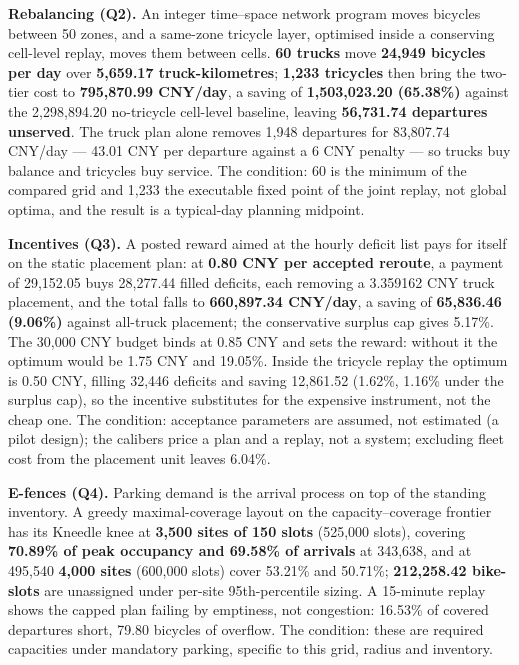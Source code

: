\textbf{Rebalancing (Q2).} An integer time--space network program moves bicycles between
50 zones, and a same-zone tricycle layer, optimised inside a conserving cell-level
replay, moves them between cells. \textbf{60 trucks} move \textbf{24,949 bicycles per
day} over \textbf{5,659.17 truck-kilometres}; \textbf{1,233 tricycles} then bring the
two-tier cost to \textbf{795,870.99 CNY/day}, a saving of \textbf{1,503,023.20
(65.38\%)} against the 2,298,894.20 no-tricycle cell-level baseline, leaving
\textbf{56,731.74 departures unserved}. The truck plan alone removes 1,948 departures
for 83,807.74 CNY/day --- 43.01 CNY per departure against a 6 CNY penalty --- so trucks
buy balance and tricycles buy service. The condition: 60 is the minimum of the compared
grid and 1,233 the executable fixed point of the joint replay, not global optima, and
the result is a typical-day planning midpoint.

\textbf{Incentives (Q3).} A posted reward aimed at the hourly deficit list pays for
itself on the static placement plan: at \textbf{0.80 CNY per accepted reroute}, a
payment of 29,152.05 buys 28,277.44 filled deficits, each removing a 3.359162 CNY truck
placement, and the total falls to \textbf{660,897.34 CNY/day}, a saving of
\textbf{65,836.46 (9.06\%)} against all-truck placement; the conservative surplus cap
gives 5.17\%. The 30,000 CNY budget binds at 0.85 CNY and sets the reward: without it
the optimum would be 1.75 CNY and 19.05\%. Inside the tricycle replay the optimum is
0.50 CNY, filling 32,446 deficits and saving 12,861.52 (1.62\%, 1.16\% under the surplus
cap), so the incentive substitutes for the expensive instrument, not the cheap one. The
condition: acceptance parameters are assumed, not estimated (a pilot design); the
calibers price a plan and a replay, not a system; excluding fleet cost from the
placement unit leaves 6.04\%.

\textbf{E-fences (Q4).} Parking demand is the arrival process on top of the standing
inventory. A greedy maximal-coverage layout on the capacity--coverage frontier has its
Kneedle knee at \textbf{3,500 sites of 150 slots} (525,000 slots), covering
\textbf{70.89\% of peak occupancy and 69.58\% of arrivals} at 343,638, and at 495,540
\textbf{4,000 sites} (600,000 slots) cover 53.21\% and 50.71\%; \textbf{212,258.42
bike-slots} are unassigned under per-site 95th-percentile sizing. A 15-minute replay shows the
capped plan failing by emptiness, not congestion: 16.53\% of covered departures short,
79.80 bicycles of overflow. The condition: these are required capacities under
mandatory parking, specific to this grid, radius and inventory.

